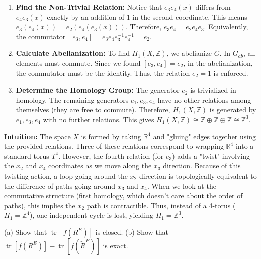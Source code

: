 \begin{solution}
\begin{enumerate}
    \item \textbf{Find the Non-Trivial Relation:} Notice that $e_3 e_4 (x)$ differs from $e_4 e_3 (x)$ exactly by an addition of $1$ in the second coordinate.
    This means $e_3(e_4(x)) = e_2(e_4(e_3(x)))$. 
    Therefore, $e_3 e_4 = e_2 e_4 e_3$.
    Equivalently, the commutator $[e_3, e_4] = e_3 e_4 e_3^{-1} e_4^{-1} = e_2$.
    
    \item \textbf{Calculate Abelianization:} To find $H_1(X, \mathbb{Z})$, we abelianize $G$. In $G_{ab}$, all elements must commute.
    Since we found $[e_3, e_4] = e_2$, in the abelianization, the commutator must be the identity. 
    Thus, the relation $e_2 = 1$ is enforced.
    
    \item \textbf{Determine the Homology Group:} The generator $e_2$ is trivialized in homology. The remaining generators $e_1, e_3, e_4$ have no other relations among themselves (they are free to commute).
    Therefore, $H_1(X, \mathbb{Z})$ is generated by $e_1, e_3, e_4$ with no further relations.
    This gives $H_1(X, \mathbb{Z}) \cong \mathbb{Z} \oplus \mathbb{Z} \oplus \mathbb{Z} \cong \mathbb{Z}^3$.
\end{enumerate}

\medskip
\textbf{Intuition:}
The space $X$ is formed by taking $\mathbb{R}^4$ and "gluing" edges together using the provided relations. Three of these relations correspond to wrapping $\mathbb{R}^4$ into a standard torus $T^4$. However, the fourth relation (for $e_3$) adds a "twist" involving the $x_2$ and $x_4$ coordinates as we move along the $x_3$ direction. Because of this twisting action, a loop going around the $x_2$ direction is topologically equivalent to the difference of paths going around $x_3$ and $x_4$. When we look at the commutative structure (first homology, which doesn't care about the order of paths), this implies the $x_2$ path is contractible. Thus, instead of a 4-torus ($H_1 = \mathbb{Z}^4$), one independent cycle is lost, yielding $H_1 = \mathbb{Z}^3$.
\end{solution}

\begin{exercise}
\label{geometry:2019:4}
(a) Show that $\operatorname{tr}[f(R^{E})]$ is closed.
(b) Show that $\operatorname{tr}[f(R^{E})] - \operatorname{tr}[f(\widetilde{R}^{E})]$ is exact.
\end{exercise}

